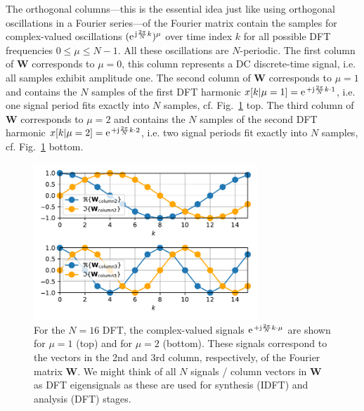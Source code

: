 \documentclass[11pt,a4paper,DIV=12]{scrartcl}
\begin{document}
%
The orthogonal columns---this is the essential idea just like using
orthogonal oscillations in a Fourier series---of the Fourier matrix contain
the samples for complex-valued
oscillations $(\e^{\im \frac{2\pi}{N} k})^\mu$ over time index $k$ for all possible
DFT frequencies $0 \leq \mu \leq N-1$.
%
All these oscillations are $N$-periodic.
%
The first column of $\bm W$ corresponds to $\mu=0$, this column represents a DC discrete-time
signal, i.e. all samples exhibit amplitude one.
%
The second column of $\bm W$ corresponds to $\mu=1$ and contains the $N$ samples of the
first DFT harmonic $x[k|\mu=1]=\e^{+\im \frac{2\pi}{N} k \cdot 1}$,
i.e. one signal period fits exactly into $N$ samples, cf.
Fig.~\ref{fig:dft_eigensignals_columns} top.
%
The third column of $\bm W$ corresponds to $\mu=2$ and contains the $N$ samples of the
second DFT harmonic $x[k|\mu=2]=\e^{+\im \frac{2\pi}{N} k \cdot 2}$,
i.e. two signal periods fit exactly into $N$ samples, cf.
Fig.~\ref{fig:dft_eigensignals_columns} bottom.
%
\begin{figure}[t] 
		\centering
		\includegraphics[width=0.75\textwidth]{graphics/dft_eigensignals_columns.pdf}
		\caption{For the $N=16$ DFT, the complex-valued signals
    $\e^{+ \im \frac{2\pi}{N} k \cdot\mu}$ are shown for $\mu=1$ (top) and for
    $\mu=2$ (bottom).
    These signals correspond to the vectors in the 2nd and 3rd column,
    respectively, of the Fourier matrix $\bm W$.
    We might think of all $N$ signals / column vectors in $\bm W$ as DFT eigensignals
    as these are used for synthesis (IDFT) and analysis (DFT) stages.}
		\label{fig:dft_eigensignals_columns}
\end{figure}
\end{document}
